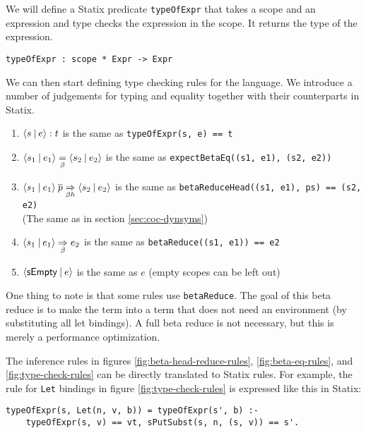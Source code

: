 We will define a Statix predicate \verb|typeOfExpr| that takes a scope and an expression and type checks the expression in the scope. It returns the type of the expression.

\begin{lstlisting}
typeOfExpr : scope * Expr -> Expr
\end{lstlisting}
We can then start defining type checking rules for the language. We introduce a number of judgements for typing and equality together with their counterparts in Statix.
\begin{enumerate}
	\item $\langle s \: | \: e\rangle : t$ is the same as \verb|typeOfExpr(s, e) == t|
	\item $\langle s_1 \: | \: e_1\rangle \underset{\beta}{=} \langle s_2 \: | \: e_2\rangle$ is the same as \verb|expectBetaEq((s1, e1), (s2, e2))|
	\item $\langle s_1 \: | \: e_1\rangle \: \overline{p} \underset{\beta h}{\Rightarrow} \langle s_2 \: | \: e_2\rangle$ is the same as \verb|betaReduceHead((s1, e1), ps) == (s2, e2)| \\ (The same as in section \ref{sec:coc-dynsyms})
	\item $\langle s_1 \: | \: e_1\rangle \underset{\beta}{\Rightarrow} e_2$ is the same as \verb|betaReduce((s1, e1)) == e2|
	\item $\langle\mathsf{sEmpty} \: | \: e\rangle$ is the same as $e$ (empty scopes can be left out)
\end{enumerate}

One thing to note is that some rules use \verb|betaReduce|. The goal of this beta reduce is to make the term into a term that does not need an environment (by substituting all let bindings). A full beta reduce is not necessary, but this is merely a performance optimization.

The inference rules in figures \ref{fig:beta-head-reduce-rules}, \ref{fig:beta-eq-rules}, and \ref{fig:type-check-rules} can be directly translated to Statix rules. For example, the rule for \verb|Let| bindings in figure \ref{fig:type-check-rules} is expressed like this in Statix:
\begin{lstlisting}
typeOfExpr(s, Let(n, v, b)) = typeOfExpr(s', b) :-
    typeOfExpr(s, v) == vt, sPutSubst(s, n, (s, v)) == s'.
\end{lstlisting}

